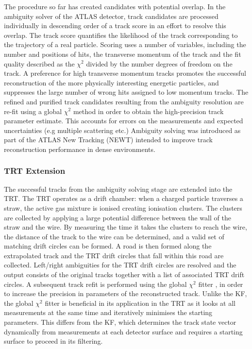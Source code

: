 The procedure so far has created candidates with potential overlap. In the ambiguity solver of the ATLAS detector, track candidates are processed individually in descending order of a track score in an effort to resolve this overlap. The track score quantifies the likelihood of the track corresponding to the trajectory of a real particle. Scoring uses a number of variables, including the number and positions of hits, the transverse momentum of the track and the fit quality described as the $\chi^{2}$ divided by the number degrees of freedom on the track. A preference for high transverse momentum tracks promotes the successful reconstruction of the more physically interesting energetic particles, and suppresses the large number of wrong hits assigned to low momentum tracks. The refined and purified track candidates resulting from the ambiguity resolution are re-fit using a global $\chi^{2}$ method in order to obtain the high-precision track parameter estimate. This accounts for errors on the measurements and expected uncertainties (e.g multiple scattering etc.) Ambiguity solving was introduced as part of the ATLAS New Tracking (NEWT) \cite{Cornelissen:2007vba} intended to improve track reconstruction performance in dense environments. 

\subsubsection{TRT Extension}
The successful tracks from the ambiguity solving stage are extended into the TRT. The TRT operates as a drift chamber: when a charged particle traverses a straw, the active gas mixture is ionised creating ionisation clusters.  The clusters are collected by applying a large potential difference between the wall of the straw and the wire. By measuring the time it takes the clusters to reach the wire, the distance of the track to the wire can be determined, and a valid set of matching drift circles can be formed. A road is then formed along the extrapolated track and the TRT drift circles that fall within this road are collected. Left/right ambiguities for the TRT drift circles are resolved and the output consists of the original tracks together with a list of associated TRT drift circles. A subsequent track refit is performed using the global $\chi^{2}$ fitter \cite{TGCornelissen2008}, in order to increase the precision in parameters of the reconstructed track. Unlike the KF, the global $\chi^{2}$ fitter is beneficial in its application in the TRT as it looks at all measurements at the same time and iteratively minimises the starting parameters. This differs from the KF, which determines the track state vector dynamically from measurements at each detector surface and requires a starting surface to proceed in its filtering. 

